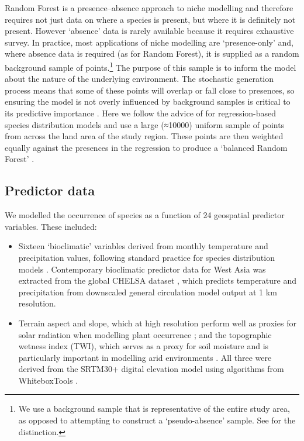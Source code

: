 \documentclass[
  authoryear,
  preprint]{elsarticle}
\providecommand{\tightlist}{%
  \setlength{\itemsep}{0pt}\setlength{\parskip}{0pt}}
\begin{document}
Random Forest is a presence--absence approach to niche modelling and
therefore requires not just data on where a species is present, but
where it is definitely not present. However `absence' data is rarely
available because it requires exhaustive survey. In practice, most
applications of niche modelling are `presence-only' and, where absence
data is required (as for Random Forest), it is supplied as a random
background sample of points.\footnote{We use a background sample that is
  representative of the entire study area, as opposed to attempting to
  construct a `pseudo-absence' sample. See \citet{SilleroEtAl2021} for
  the distinction.} The purpose of this sample is to inform the model
about the nature of the underlying environment. The stochastic
generation process means that some of these points will overlap or fall
close to presences, so ensuring the model is not overly influenced by
background samples is critical to its predictive importance
\citep{ValaviEtAl2022}. Here we follow the advice of
\citet{BarbetMassinEtAl2012} for regression-based species distribution
models and use a large (≈10000) uniform sample of points from across the
land area of the study region. These points are then weighted equally
against the presences in the regression to produce a `balanced Random
Forest' \citep{ValaviEtAl2022}.

\subsection{Predictor data}\label{sec-predictors}

We modelled the occurrence of species as a function of 24 geospatial
predictor variables. These included:

\begin{itemize}
\tightlist
\item
  Sixteen `bioclimatic' variables derived from monthly temperature and
  precipitation values, following standard practice for species
  distribution models \citep{HijmansEtAl2005}. Contemporary bioclimatic
  predictor data for West Asia was extracted from the global CHELSA
  dataset \citep{KargerEtAl2017}, which predicts temperature and
  precipitation from downscaled general circulation model output at 1 km
  resolution.
\end{itemize}

\begin{itemize}
\tightlist
\item
  Terrain aspect and slope, which at high resolution perform well as
  proxies for solar radiation when modelling plant occurrence
  \citep{AustinVanNiel2011, LeempoelEtAl2015}; and the topographic
  wetness index (TWI), which serves as a proxy for soil moisture and is
  particularly important in modelling arid environments
  \citep{KopeckyCizkova2010, CamposEtAl2016, DiVirgilioEtAl2018}. All
  three were derived from the SRTM30+ digital elevation model using
  algorithms from WhiteboxTools \citep{Lindsay2016}.
\end{itemize}
\end{document}
